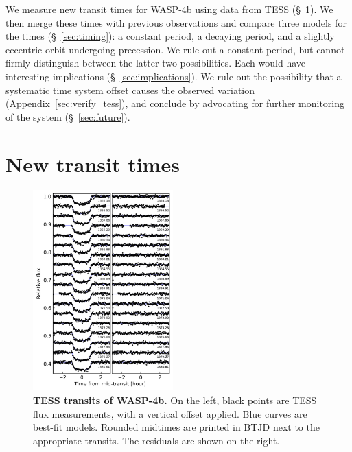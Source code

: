 \documentclass[12pt,twocolumn,tighten]{aastex62}
\begin{document}
We measure new transit times for WASP-4b using data from TESS
(\S~\ref{sec:transits}).  We then merge these times with previous
observations and compare three models for the times
(\S~\ref{sec:timing}): a constant period, a decaying period, and a
slightly eccentric orbit undergoing precession.  We rule out a
constant period, but cannot firmly distinguish between the latter two
possibilities.  Each would have interesting implications
(\S~\ref{sec:implications}).  We rule out the possibility that a
systematic time system offset causes the observed variation
(Appendix~\ref{sec:verify_tess}), and conclude by advocating for
further monitoring of the system (\S~\ref{sec:future}).



\section{New transit times}
\label{sec:transits}

\begin{figure}[t]
    \begin{center}
        \includegraphics[width=0.48\textwidth]{f1.png}
    \end{center}
    \vspace{-0.5cm}
    \caption{
        {\bf TESS transits of WASP-4b.} On the left, black points are
        TESS flux measurements, with a vertical offset applied. Blue
        curves are best-fit models. Rounded midtimes are printed in
        BTJD next to the appropriate transits.  The residuals are
        shown on the right.
        \label{fig:lightcurves}
    }
\end{figure}
\end{document}
